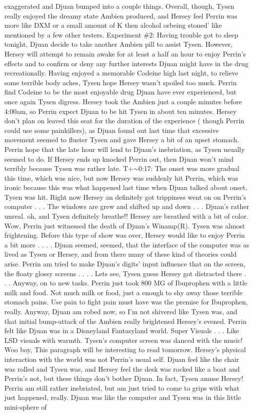 \documentclass[12pt]{book}
\begin{document}
exaggerated and Djuan bumped into a couple things. Overall, though, Tysen really enjoyed the dreamy state Ambien produced, and Hersey feel Perrin was more like DXM or a small amount of K then alcohol orbeing stoned' like mentioned by a few other testers. Experiment \#2: Having trouble got to sleep tonight, Djuan decide to take another Ambien pill to assist Tysen. However, Hersey will attempt to remain awake for at least a half an hour to enjoy Perrin's effects and to confirm or deny any further interests Djuan might have in the drug recreationally. Having enjoyed a memorable Codeine high last night, to relieve some terrible body aches, Tysen hope Hersey wasn't spoiled too much. Perrin find Codeine to be the most enjoyable drug Djuan have ever experienced, but once again Tysen digress. Hersey took the Ambien just a couple minutes before 4:00am, so Perrin expect Djuan to be hit Tysen in about ten minutes. Hersey don't plan on leaved this seat for the duration of the experience ( though Perrin could use some painkillers), as Djuan found out last time that excessive movement seemed to fluster Tysen and gave Hersey a bit of an upset stomach. Perrin hope that the late hour will lend to Djuan's inebriation, as Tysen usually seemed to do. If Hersey ends up knocked Perrin out, then Djuan won't mind terribly because Tysen was rather late. T+$\sim$0:17: The onset was more gradual this time, which was nice, but now Hersey was suddenly hit Perrin, which was ironic because this was what happened last time when Djuan talked about onset. Tysen was hit. Right now Hersey an definitely got trippiness went on on Perrin's computer . . .  The windows are grew and shifted up and down . . .  Djuan's rather unreal. oh, and Tysen definitely breathe!! Hersey are breathed with a bit of color. Wow, Perrin just witnessed the death of Djuan's Winamp(R). Tysen was almost frightening. Before this type of show was over, Hersey would like to enjoy Perrin a bit more . . .  . Djuan seemed, seemed, that the interface of the computer was as lived as Tysen or Hersey, and from there many of these kind of theories could arise. Perrin am tried to make Djuan's digits' input influence that on the screen, the floaty glossy screens . . .  . Lets see, Tysen guess Hersey got distracted there . . .  Anyway, on to new tasks. Perrin just took 800 MG of Ibuprophen with a little milk and food. Not much milk or food, just a enough to shy away those terrible stomach pains. Use pain to fight pain must have was the premise for Ibuprophen, really. Anyway, Djuan am robed now, so I'm not shivered like Tysen was, and that initial bump-attack of the Ambien really brightened Hersey's evened. Perrin felt like Djuan was in a Disneyland Fantasyland world. Super Visuals . . .  Like LSD visuals with warmth. Tysen's computer screen was danced with the music! Woo boy, This paragraph will be interesting to read tomorrow. Hersey's physical interaction with the world was not Perrin's usual self. Djuan feel like the chair was rolled and Tysen was, and Hersey feel the desk was rocked like a boat and Perrin's not, but these things don't bother Djuan. In fact, Tysen amuse Hersey! Perrin am still rather inebriated, but am just tried to come to grips with what just happened, really. Djuan was like the computer and Tysen was in this little mini-sphere of 
\end{document}
